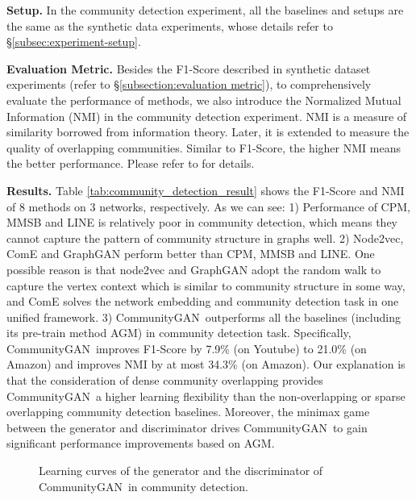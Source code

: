 \documentclass[sigconf]{acmart}
\newcommand{\ComGAN}{CommunityGAN}
\begin{document}
\vspace{5pt}\noindent\textbf{Setup.}
In the community detection experiment, all the baselines and setups are the same as the synthetic data experiments, whose details refer to \S \ref{subsec:experiment-setup}.

\vspace{5pt}\noindent\textbf{Evaluation Metric.}
Besides the F1-Score described in synthetic dataset experiments (refer to \S \ref{subsection:evaluation metric}), to comprehensively evaluate the performance of methods, we also introduce the Normalized Mutual Information (NMI) in the community detection experiment.
NMI is a measure of similarity borrowed from information theory.
Later, it is extended to measure the quality of overlapping communities.
Similar to F1-Score, the higher NMI means the better performance.
Please refer to \cite{NMI} for details.


\vspace{5pt}\noindent\textbf{Results.}
Table \ref{tab:community_detection_result} shows the F1-Score and NMI of 8 methods on 3 networks, respectively.
As we can see:
1) Performance of CPM, MMSB and LINE is relatively poor in community detection, which means they cannot capture the pattern of community structure in graphs well.
2) Node2vec, ComE and GraphGAN perform better than CPM, MMSB and LINE.
One possible reason is that node2vec and GraphGAN adopt the random walk to capture the vertex context which is similar to community structure in some way, and ComE solves the network embedding and community detection task in one unified framework.
3) \ComGAN~outperforms all the baselines (including its pre-train method AGM) in community detection task.
Specifically, \ComGAN~improves F1-Score by 7.9\% (on Youtube) to 21.0\% (on Amazon) and improves NMI by at most 34.3\% (on Amazon).
Our explanation is that the consideration of dense community overlapping provides \ComGAN~a higher learning flexibility than the non-overlapping or sparse overlapping community detection baselines.
Moreover, the minimax game between the generator and discriminator drives \ComGAN~to gain significant performance improvements based on AGM.

\begin{figure}[t]
\centering
{}
\caption{Learning curves of the generator and the discriminator of \ComGAN~in community detection.}
\label{fig:learning-curve}
\end{figure}
\end{document}
